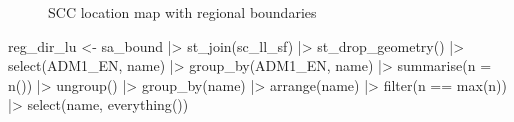 \documentclass[
  letterpaper,
  DIV=11,
  numbers=noendperiod]{scrreprt}
\newenvironment{Shaded}{\begin{snugshade}}{\end{snugshade}}
\newcommand{\AttributeTok}[1]{\textcolor[rgb]{0.40,0.45,0.13}{#1}}
\newcommand{\FunctionTok}[1]{\textcolor[rgb]{0.28,0.35,0.67}{#1}}
\newcommand{\NormalTok}[1]{\textcolor[rgb]{0.00,0.23,0.31}{#1}}
\newcommand{\OtherTok}[1]{\textcolor[rgb]{0.00,0.23,0.31}{#1}}
\newcommand{\SpecialCharTok}[1]{\textcolor[rgb]{0.37,0.37,0.37}{#1}}
\begin{document}
\begin{figure}[H]


\caption{\label{fig-scc}SCC location map with regional boundaries}

\end{figure}%

\begin{Shaded}
\begin{Highlighting}[]
\NormalTok{reg\_dir\_lu }\OtherTok{\textless{}{-}}\NormalTok{ sa\_bound }\SpecialCharTok{|\textgreater{}}
    \FunctionTok{st\_join}\NormalTok{(sc\_ll\_sf) }\SpecialCharTok{|\textgreater{}}
    \FunctionTok{st\_drop\_geometry}\NormalTok{() }\SpecialCharTok{|\textgreater{}}
    \FunctionTok{select}\NormalTok{(ADM1\_EN, name) }\SpecialCharTok{|\textgreater{}}
    \FunctionTok{group\_by}\NormalTok{(ADM1\_EN, name) }\SpecialCharTok{|\textgreater{}}
    \FunctionTok{summarise}\NormalTok{(}\AttributeTok{n =} \FunctionTok{n}\NormalTok{()) }\SpecialCharTok{|\textgreater{}}
    \FunctionTok{ungroup}\NormalTok{() }\SpecialCharTok{|\textgreater{}}
    \FunctionTok{group\_by}\NormalTok{(name) }\SpecialCharTok{|\textgreater{}}
    \FunctionTok{arrange}\NormalTok{(name) }\SpecialCharTok{|\textgreater{}}
    \FunctionTok{filter}\NormalTok{(n }\SpecialCharTok{==} \FunctionTok{max}\NormalTok{(n)) }\SpecialCharTok{|\textgreater{}}
    \FunctionTok{select}\NormalTok{(name, }\FunctionTok{everything}\NormalTok{())}
\end{Highlighting}
\end{Shaded}
\end{document}
